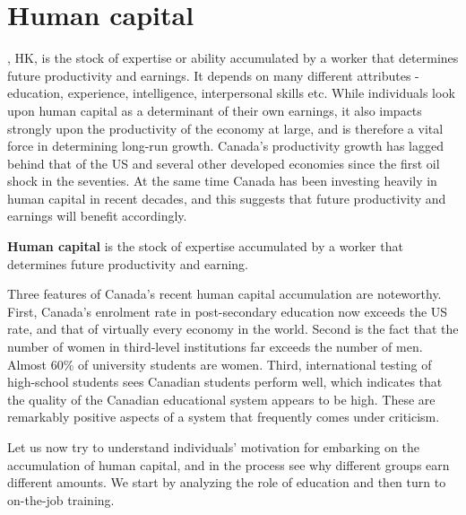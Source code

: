 \section{Human capital}\label{sec:ch13sec1}

, HK, is the stock of expertise or ability accumulated by a worker that determines future productivity and earnings. It depends on many different attributes - education, experience, intelligence, interpersonal skills etc. While individuals look upon human capital as a determinant of their own earnings, it also impacts strongly upon the productivity of the economy at large, and is therefore a vital force in determining long-run growth. Canada's productivity growth has lagged behind that of the US and several other developed economies since the first oil shock in the seventies. At the same time Canada has been investing heavily in human capital in recent decades, and this suggests that future productivity and earnings will benefit accordingly.

\begin{DefBox}
\textbf{Human capital} is the stock of expertise accumulated by a worker that determines future productivity and earning.
\end{DefBox}

Three features of Canada's recent human capital accumulation are noteworthy. First, Canada's enrolment rate in post-secondary education now exceeds the US rate, and that of virtually every economy in the world. Second is the fact that the number of women in third-level institutions far exceeds the number of men. Almost 60\% of university students are women. Third, international testing of high-school students sees Canadian students perform well, which indicates that the quality of the Canadian educational system appears to be high. These are remarkably positive aspects of a system that frequently comes under criticism.

Let us now try to understand individuals' motivation for embarking on the accumulation of human capital, and in the process see why different groups earn different amounts. We start by analyzing the role of education and then turn to on-the-job training.